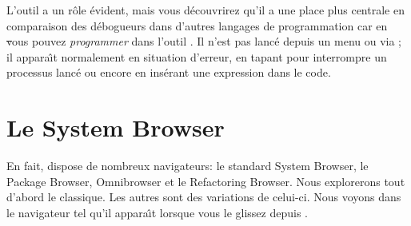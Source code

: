 \documentclass[a4paper,10pt,twoside]{book}
\begin{document}
L'outil  a un r\^ole \'evident, mais vous d\'ecouvrirez qu'il a une place plus centrale en comparaison
des d\'ebogueurs dans d'autres langages de programmation car en \st
vous pouvez \emph{programmer} dans l'outil .  Il n'est pas
lanc\'e depuis un menu ou via \toolsflap; 
il appara\^{\i}t normalement en situation d'erreur,
en tapant  pour interrompre un processus lanc\'e ou
encore en ins\'erant une expression  dans le code.





\section{Le System Browser}
\label{sec:browser} %

En fait, \sq dispose de nombreux navigateurs: le standard System Browser, le Package Browser, Omnibrowser et le Refactoring Browser. 
Nous explorerons tout d'abord le  classique. Les autres sont des variations de celui-ci.
Nous voyons dans  le navigateur tel qu'il appara\^{\i}t lorsque vous le glissez depuis  \toolsflapind.
\end{document}

